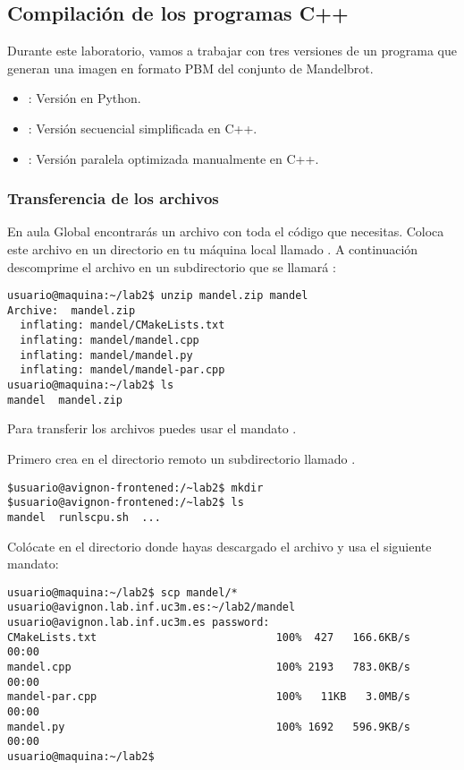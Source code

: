 \subsection{Compilación de los programas C++}

Durante este laboratorio, vamos a trabajar con tres versiones de un programa
que generan una imagen en formato PBM del conjunto de Mandelbrot.

\begin{itemize}
  \item {}: Versión en Python.
  \item {}: Versión secuencial simplificada en C++.
  \item {}: Versión paralela optimizada manualmente en C++.
\end{itemize}

\subsubsection{Transferencia de los archivos}

En aula Global encontrarás un archivo  con toda el código que
necesitas. Coloca este archivo en un directorio en tu máquina local llamado
. A continuación descomprime el archivo en un subdirectorio que
se llamará :

\begin{lstlisting}[style=terminal]
usuario@maquina:~/lab2$ unzip mandel.zip mandel
Archive:  mandel.zip
  inflating: mandel/CMakeLists.txt   
  inflating: mandel/mandel.cpp       
  inflating: mandel/mandel.py        
  inflating: mandel/mandel-par.cpp   
usuario@maquina:~/lab2$ ls
mandel  mandel.zip
\end{lstlisting}

Para transferir los archivos puedes usar el mandato .

Primero crea en el directorio remoto un subdirectorio llamado .

\begin{lstlisting}[style=terminal]
$usuario@avignon-frontened:/~lab2$ mkdir
$usuario@avignon-frontened:/~lab2$ ls
mandel  runlscpu.sh  ...
\end{lstlisting}

Colócate en el directorio donde hayas descargado el archivo 
y usa el siguiente mandato:

\begin{lstlisting}[style=terminal,basicstyle=\tiny\ttfamily,columns=fixed]
usuario@maquina:~/lab2$ scp mandel/* usuario@avignon.lab.inf.uc3m.es:~/lab2/mandel
usuario@avignon.lab.inf.uc3m.es password: 
CMakeLists.txt                            100%  427   166.6KB/s   00:00    
mandel.cpp                                100% 2193   783.0KB/s   00:00    
mandel-par.cpp                            100%   11KB   3.0MB/s   00:00    
mandel.py                                 100% 1692   596.9KB/s   00:00    
usuario@maquina:~/lab2$ 
\end{lstlisting}

